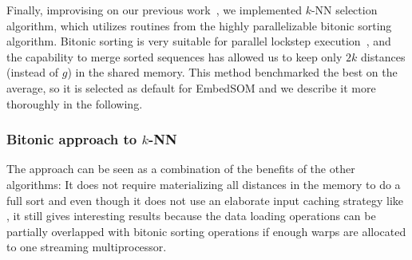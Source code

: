 

Finally, improvising on our previous work~\cite{krulivs2015optimizing}, we implemented  $k$-NN selection algorithm, which utilizes routines from the highly parallelizable bitonic sorting algorithm.
Bitonic sorting is very suitable for parallel lockstep execution~\cite{krulivs2017employing}, and the capability to merge sorted sequences has allowed us to keep only $2k$ distances (instead of $g$) in the shared memory.
This method benchmarked the best on the average, so it is selected as default for EmbedSOM and we describe it more thoroughly in the following.


\subsubsection{Bitonic approach to $k$-NN}

The  approach can be seen as a combination of the benefits of the other algorithms: It does not require materializing all distances in the memory to do a full sort and even though it does not use an elaborate input caching strategy like , it still gives interesting results because the data loading operations can be partially overlapped with bitonic sorting operations if enough warps are allocated to one streaming multiprocessor.

